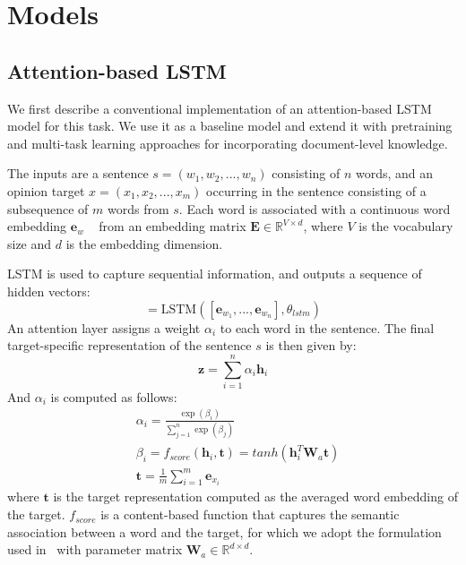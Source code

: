 \documentclass[11pt,a4paper]{article}
\begin{document}
\section{Models}
\subsection{Attention-based LSTM}
We first describe a conventional implementation of an attention-based LSTM model for this task. We use it as a baseline model and extend it with pretraining and multi-task learning approaches for incorporating document-level knowledge. 

The inputs are a sentence $s = (w_1, w_2, ..., w_n)$ consisting of $n$ words, and an opinion target $x = (x_1, x_2, ..., x_m)$ occurring in the sentence consisting of a subsequence of $m$ words from $s$. Each word is associated with a continuous word embedding $\mathbf{e}_w$ ~\cite{Mikolov:13} from an embedding matrix $\mathbf{E} \in \mathbb{R}^{V \times d}$, where $V$ is the vocabulary size and $d$ is the embedding dimension.

LSTM is used to capture sequential information, and outputs a sequence of hidden vectors:
\begin{equation}
[\mathbf{h}_1, ..., \mathbf{h}_n] = \text{LSTM}([\mathbf{e}_{w_1}, ..., \mathbf{e}_{w_n}], \theta_{lstm})
\end{equation}
An attention layer assigns a weight $\alpha_i$ to each word in the sentence. The final target-specific representation of the sentence $s$ is then given by:
\begin{equation}
\mathbf{z} = \sum_{i=1}^{n} \alpha_i \mathbf{h}_i
\end{equation}
And $\alpha_i$ is computed as follows:
\begin{align}
&\alpha_i = \frac{\exp(\beta_i)}{\sum_{j=1}^{n}\exp(\beta_j)} \\
&\beta_i = f_{score}(\mathbf{h}_i, \mathbf{t}) = tanh(\mathbf{h}_i^T \mathbf{W}_a \mathbf{t})\\
&\mathbf{t} = \frac{1}{m} \sum_{i=1}^{m}\mathbf{e}_{x_i} \label{target_rep}
\end{align}
where $\mathbf{t}$ is the target representation computed as the averaged word embedding of the target. $f_{score}$ is a content-based function that captures the semantic association between a word and the target, for which we adopt the formulation used in~\cite{Luong:15b,He:17} with parameter matrix $\mathbf{W}_a \in \mathbb{R}^{d \times d}$. 
\end{document}
